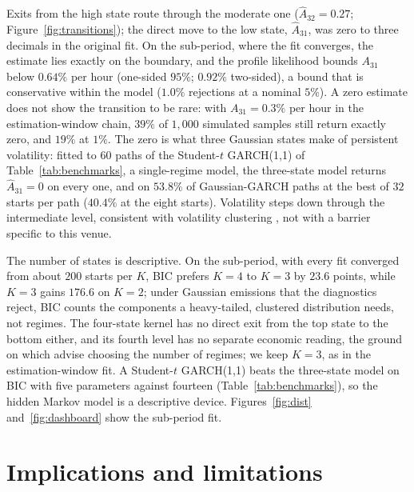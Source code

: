 \documentclass[10pt,a4paper]{article}
\begin{document}
Exits from the high state route through the moderate one ($\hat A_{32} = 0.27$; Figure~\ref{fig:transitions}); the direct move to the low state, $\hat A_{31}$, was zero to three decimals in the original fit. On the sub-period, where the fit converges, the estimate lies exactly on the boundary, and the profile likelihood bounds $A_{31}$ below $0.64\%$ per hour (one-sided $95\%$; $0.92\%$ two-sided), a bound that is conservative within the model ($1.0\%$ rejections at a nominal $5\%$). A zero estimate does not show the transition to be rare: with $A_{31} = 0.3\%$ per hour in the estimation-window chain, $39\%$ of $1{,}000$ simulated samples still return exactly zero, and $19\%$ at $1\%$. The zero is what three Gaussian states make of persistent volatility: fitted to $60$ paths of the Student-$t$ GARCH(1,1) of Table~\ref{tab:benchmarks}, a single-regime model, the three-state model returns $\hat A_{31} = 0$ on every one, and on $53.8\%$ of Gaussian-GARCH paths at the best of $32$ starts per path ($40.4\%$ at the eight starts). Volatility steps down through the intermediate level, consistent with volatility clustering \citep{cont2005volatility}, not with a barrier specific to this venue.

The number of states is descriptive. On the sub-period, with every fit converged from about $200$ starts per $K$, BIC prefers $K{=}4$ to $K{=}3$ by $23.6$ points, while $K{=}3$ gains $176.6$ on $K{=}2$; under Gaussian emissions that the diagnostics reject, BIC counts the components a heavy-tailed, clustered distribution needs, not regimes. The four-state kernel has no direct exit from the top state to the bottom either, and its fourth level has no separate economic reading, the ground on which \citet{ang2012} advise choosing the number of regimes; we keep $K{=}3$, as in the estimation-window fit. A Student-$t$ GARCH(1,1) beats the three-state model on BIC with five parameters against fourteen (Table~\ref{tab:benchmarks}), so the hidden Markov model is a descriptive device. Figures~\ref{fig:dist} and~\ref{fig:dashboard} show the sub-period fit.

\section{Implications and limitations}\label{sec:implications}
\end{document}
